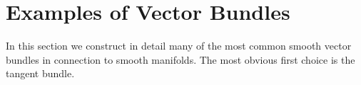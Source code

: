 



\section{Examples of Vector Bundles}

In this section we construct in detail many of the most common smooth vector bundles in connection to smooth manifolds.  The most obvious first choice is the tangent bundle.
















\begin{comment}

\subsection{The Cotangent Bundle}




\subsection{The Tensor Bundle}




\subsection{The Alternating Bundle}



\subsection{The Jet Bundle}
\end{comment}
